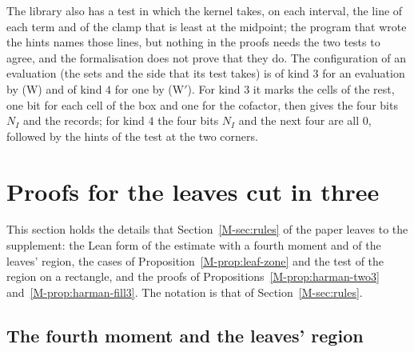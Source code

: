 \documentclass[11pt]{article}
\numberwithin{equation}{section}
\begin{document}
The library also has a test in which the kernel takes, on each interval, the line of each term and of the clamp that
is least at the midpoint; the program that wrote the hints names those lines, but nothing in the proofs needs the two
tests to agree, and the formalisation does not prove that they do. The configuration of an evaluation (the sets and
the side that its test takes) is of kind $3$ for an evaluation by (W) and of kind $4$ for one by (W$'$). For kind $3$
it marks the cells of the rest, one bit for each cell of the box and one for the cofactor, then gives the four bits
$N_I$ and the records; for kind $4$ the four bits $N_I$ and the next four are all $0$, followed by the hints of the
test at the two corners.

\section{Proofs for the leaves cut in three}\label{sup:leaves}

This section holds the details that Section~\ref{M-sec:rules} of the paper leaves to the supplement: the Lean form of
the estimate with a fourth moment and of the leaves' region, the cases of Proposition~\ref{M-prop:leaf-zone} and the
test of the region on a rectangle, and the proofs of Propositions~\ref{M-prop:harman-two3}
and~\ref{M-prop:harman-fill3}. The notation is that of Section~\ref{M-sec:rules}.

\subsection*{The fourth moment and the leaves' region}
\end{document}
